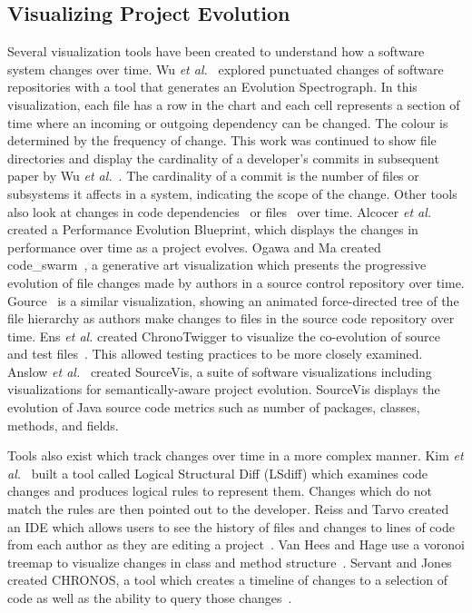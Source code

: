 \subsection{Visualizing Project Evolution}

Several visualization tools have been created to understand how a software system changes over time. Wu \textit{et al.}~\cite{wu2004a} explored punctuated changes of software repositories with a tool that generates an Evolution Spectrograph. In this visualization, each file has a row in the chart and each cell represents a section of time where an incoming or outgoing dependency can be changed. The colour is determined by the frequency of change. This work was continued to show file directories and display the cardinality of a developer's commits in subsequent paper by Wu \textit{et al.}~\cite{wu2004}. The cardinality of a commit is the number of files or subsystems it affects in a system, indicating the scope of the change. Other tools also look at changes in code dependencies~\cite{6980224} or files~\cite{6650525, 7332421, voinea2006} over time. Alcocer \textit{et al.}~\cite{6650523} created a Performance Evolution Blueprint, which displays the changes in performance over time as a project evolves. Ogawa and Ma created code\_swarm~\cite{codeswarm}, a generative art visualization which presents the progressive evolution of file changes made by authors in a source control repository over time. Gource~\cite{gource} is a similar visualization, showing an animated force-directed tree of the file hierarchy as authors make changes to files in the source code repository over time. Ens \textit{et al.} created ChronoTwigger to visualize the co-evolution of source and test files~\cite{6980223}. This allowed testing practices to be more closely examined. Anslow \textit{et al.}~\cite{sourcevis} created SourceVis, a suite of software visualizations including visualizations for semantically-aware project evolution. SourceVis displays the evolution of Java source code metrics such as number of packages, classes, methods, and fields.

Tools also exist which track changes over time in a more complex manner. Kim \textit{et al.}~\cite{Kim:2009:DRS:1555001.1555046} built a tool called Logical Structural Diff (LSdiff) which examines code changes and produces logical rules to represent them. Changes which do not match the rules are then pointed out to the developer. Reiss and Tarvo created an IDE which allows users to see the history of files and changes to lines of code from each author as they are editing a project~\cite{6650521}. Van Hees and Hage use a voronoi treemap to visualize changes in class and method structure~\cite{7332410}. Servant and Jones created CHRONOS, a tool which creates a timeline of changes to a selection of code as well as the ability to query those changes~\cite{6650547}.



